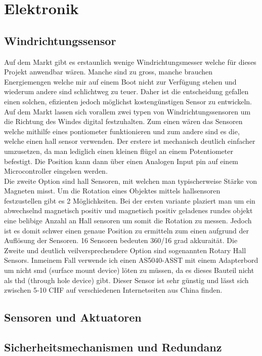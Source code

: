 

\chapter{Elektronik}
\label{chap:elektronik}

\section{Windrichtungssensor}
Auf dem Markt gibt es erstaunlich wenige Windrichtungsmesser welche für dieses Projekt anwendbar wären. Manche sind zu gross, manche brauchen Energiemengen welche mir auf einem Boot nicht zur Verfügung stehen und wiederum andere sind schlichtweg zu teuer. Daher ist die entscheidung gefallen einen solchen, efizienten jedoch möglichst kostengünstigen Sensor zu entwickeln.
Auf dem Markt lassen sich vorallem zwei typen von Windrichtungssensoren um die Richtung des Windes digital festzuhalten. Zum einen wären das Sensoren welche mithilfe eines pontiometer funktionieren und zum andere sind es die, welche einen hall sensor verwenden. Der erstere ist mechanisch deutlich einfacher umzusetzen, da man lediglich einen kleinen flügel an einem Potentiometer befestigt. Die Position kann dann über einen Analogen Input pin auf einem Microcontroller eingelsen werden.
\\
Die zweite Option sind hall Sensoren, mit welchen man typischerweise Stärke von Magneten misst. Um die Rotation eines Objektes mittels hallsensoren festzustellen gibt es 2 Möglichkeiten. Bei der ersten variante plaziert man um ein abwechselnd magnetisch positiv und magnetisch positiv geladenes rundes objekt eine belibige Anzahl an Hall sensoren um somit die Rotation zu messen. Jedoch ist es domit schwer einen genaue Position zu ermitteln zum einen aufgrund der Auflösung der Sensoren. 16 Sensoren bedeuten 360/16 grad akkuraität.  Die Zweite und deutlich veilversprechendere Option sind sogenannten Rotary Hall Sensors. Inmeinem Fall verwende ich einen AS5040-ASST mit einem Adapterbord um nicht smd (surface mount device) löten zu müssen, da es dieses Bauteil nicht als thd (through hole device) gibt. Dieser Sensor ist sehr günstig und lässt sich zwischen 5-10 CHF auf verschiedenen Internetseiten aus China finden. 

\section{Sensoren und Aktuatoren}
\section{Sicherheitsmechanismen und Redundanz }